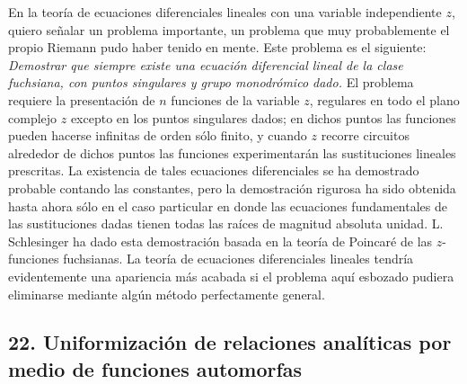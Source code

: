 \documentclass[a4paper, 12pt]{article}
\begin{document}
{En la teoría de ecuaciones diferenciales lineales con una variable independiente $z$, quiero señalar un problema importante, un problema que muy probablemente el propio Riemann pudo haber tenido en mente. Este problema es el siguiente: \textit{Demostrar que siempre existe una ecuación diferencial lineal de la clase fuchsiana, con puntos singulares y grupo monodrómico dado.} El problema requiere la presentación de $n$ funciones de la variable $z$, regulares en todo el plano complejo $z$ excepto en los puntos singulares dados; en dichos puntos las funciones pueden hacerse infinitas de orden sólo finito, y cuando $z$ recorre circuitos alrededor de dichos puntos las funciones experimentarán las sustituciones lineales prescritas. La existencia de tales ecuaciones diferenciales se ha demostrado probable contando las constantes, pero la demostración rigurosa ha sido obtenida hasta ahora sólo en el caso particular en donde las ecuaciones fundamentales de las sustituciones dadas tienen todas las raíces de magnitud absoluta unidad. L. Schlesinger ha dado esta demostración basada en la teoría de Poincaré de las $z$-funciones fuchsianas. La teoría de ecuaciones diferenciales lineales tendría evidentemente una apariencia más acabada si el problema aquí esbozado pudiera eliminarse mediante algún método perfectamente general.


\subsection*{22. Uniformización de relaciones analíticas
por medio de funciones automorfas}

}
\end{document}
